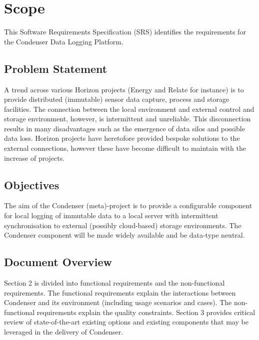 	\section{Scope}
This Software Requirements Specification (SRS) identifies the requirements for the Condenser Data Logging Platform.
		\subsection{Problem Statement}
A trend across various Horizon projects (Energy and Relate for instance) is to provide distributed (immutable) sensor data capture, process and storage facilities. The connection between the local environment and external control and storage environment, however, is intermittent and unreliable.  This disconnection results in many disadvantages such as the emergence of data silos and possible data loss. Horizon projects have heretofore provided bespoke solutions to the external connections, however these have become difficult to maintain with the increase of projects.		
		\subsection{Objectives}
The aim of the Condenser (meta)-project is to provide a configurable component for local logging of immutable data to a local server with intermittent synchronisation to external (possibly cloud-based) storage environments. The Condenser component will be made widely available and be data-type neutral.
		\subsection{Document Overview}
Section 2 is divided into functional requirements and the non-functional requirements. The functional requirements explain the interactions between Condenser and its environment (including usage scenarios and cases). The non-functional requirements explain the quality constraints. Section 3 provides critical review of state-of-the-art existing options and existing components that may be leveraged in the delivery of Condenser.